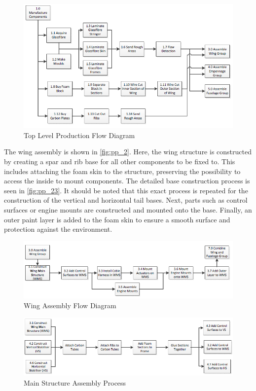 \begin{figure}[ht]
    \centering
    \includegraphics[width=\textwidth]{Production/Figures/10}
    \caption{Top Level Production Flow Diagram}
    \label{fig:pp_manu}
\end{figure}

The wing assembly is shown in \autoref{fig:pp_2}. Here, the wing structure is constructed by creating a spar and rib base for all other components to be fixed to. This includes attaching the foam skin to the structure, preserving the possibility to access the inside to mount components. The detailed base construction process is seen in \autoref{fig:pp_23}. It should be noted that this exact process is repeated for the construction of the vertical and horizontal tail bases. Next, parts such as control surfaces or engine mounts are constructed and mounted onto the base. Finally, an outer paint layer is added to the foam skin to ensure a smooth surface and protection against the environment.

\begin{figure}[H]
    \centering
    \includegraphics[width=\textwidth]{Production/Figures/30}
    \caption{Wing Assembly Flow Diagram}
    \label{fig:pp_2}
\end{figure}

\begin{figure}[H]
    \centering
    \includegraphics[width=\textwidth]{Production/Figures/3040}
    \caption{Main Structure Assembly Process}
    \label{fig:pp_23}
\end{figure}

